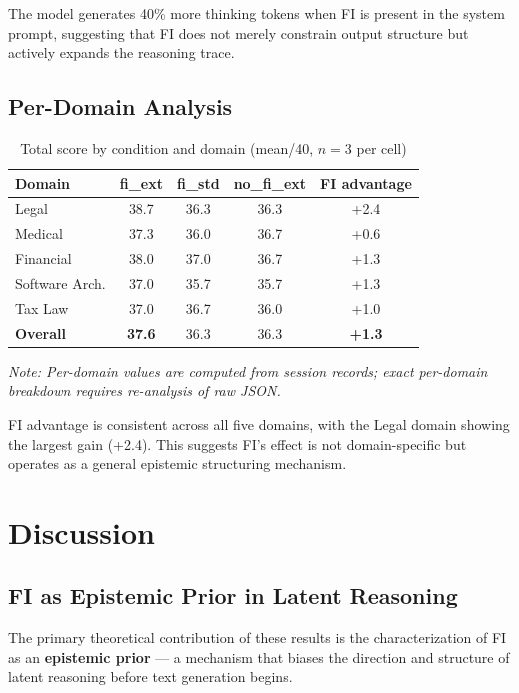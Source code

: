 \documentclass[11pt,a4paper]{article}
\begin{document}
The model generates 40\% more thinking tokens when FI is present in the
system prompt, suggesting that FI does not merely constrain output structure
but actively expands the reasoning trace.

\subsection{Per-Domain Analysis}

\begin{table}[h]
\centering
\caption{Total score by condition and domain (mean/40, $n=3$ per cell)}
\begin{tabular}{lcccc}
\toprule
Domain & fi\_ext & fi\_std & no\_fi\_ext & FI advantage\\
\midrule
Legal            & 38.7 & 36.3 & 36.3 & +2.4 \\
Medical          & 37.3 & 36.0 & 36.7 & +0.6 \\
Financial        & 38.0 & 37.0 & 36.7 & +1.3 \\
Software Arch.   & 37.0 & 35.7 & 35.7 & +1.3 \\
Tax Law          & 37.0 & 36.7 & 36.0 & +1.0 \\
\midrule
\textbf{Overall} & \textbf{37.6} & 36.3 & 36.3 & \textbf{+1.3} \\
\bottomrule
\end{tabular}
\end{table}

\noindent\textit{Note: Per-domain values are computed from session records;
  exact per-domain breakdown requires re-analysis of raw JSON.}

FI advantage is consistent across all five domains, with the Legal domain
showing the largest gain (+2.4). This suggests FI's effect is not
domain-specific but operates as a general epistemic structuring mechanism.

\section{Discussion}

\subsection{FI as Epistemic Prior in Latent Reasoning}

The primary theoretical contribution of these results is the characterization
of FI as an \textbf{epistemic prior} — a mechanism that biases the direction and
structure of latent reasoning before text generation begins.
\end{document}
